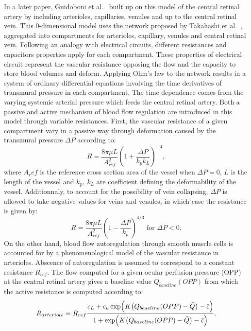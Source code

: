 \documentclass[12pt,a4paper]{article}
\begin{document}
In a later paper, Guidoboni et al.~\cite{Guidoboni_2014b} built up on this model of the central retinal artery by including arterioles, capillaries, venules and up to the central retinal vein.
This 0-dimensional model uses the network proposed by Takahashi et al.~\cite{Takahashi_2009}, aggregated into compartments for arterioles, capillary, venules and central retinal vein.
Following an analogy with electrical circuits, different resistances and capacitors properties apply for each compartment.
These properties of electrical circuit represent the vascular resistance opposing the flow and the capacity to store blood volumes and deform.
Applying Ohm's law to the network results in a system of ordinary differential equations involving the time derivatives of transmural pressure in each compartment.
The time dependence comes from the varying systemic arterial pressure which feeds the central retinal artery.
Both a passive and active mechanism of blood flow regulation are introduced in this model through variable resistances.
First, the vascular resistance of a given compartment vary in a passive way through deformation caused by the transmural pressure $\Delta P$ according to:
\begin{equation}
  \label{eq:PassiveVariableResistance}
  R = \frac{8\pi\mu L}{A^2_{ref}}\left(1+\frac{\Delta P}{k_pk_L}\right)^{-4},
\end{equation}
where $A_ref$ is the reference cross section area of the vessel when $\Delta P = 0$, $L$ is the length of the vessel and $k_p,~k_L$ are coefficient defining the deformability of the vessel.
Additionnaly, to account for the possibility of vein collapsing, $\Delta P$ is allowed to take negative values for veins and venules, in which case the resistance is given by:
\begin{equation}
  \label{eq:PassiveVariableResistanceCollapse}
  R = \frac{8\pi\mu L}{A^2_{ref}}\left(1-\frac{\Delta P}{k_p}\right)^{4/3} \text{ for } \Delta P<0.
\end{equation}
On the other hand, blood flow autoregulation through smooth muscle cells is accounted for by a phenomenological model of the vascular resistance in arterioles.
Abscence of autoregulation is assumed to correspond to a constant resistance $R_{ref}$.
The flow computed for a given ocular perfusion pressure (OPP) at the central retinal artery gives a baseline value $Q_{baseline}(OPP)$ from which the active resistance is computed according to:
\begin{equation}
  \label{eq:ActiveResistancePhenomenological}
  R_{arteriole} = R_{ref}\frac{c_L + c_u\exp\Bigl(K\bigl(Q_{baseline}(OPP)-\bar Q\bigr)-\hat c\Bigr)}{1 + \exp\Bigl(K\bigl(Q_{baseline}(OPP)-\bar Q\bigr)-\hat c\Bigr)}.
\end{equation}
\end{document}
